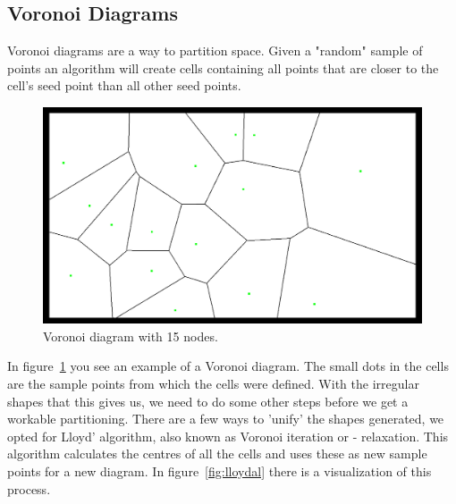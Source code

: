 \documentclass[11pt,a4paper,twocolumn]{article}
\begin{document}
\subsection{Voronoi Diagrams}
Voronoi diagrams are a way to partition space. Given a "random" sample of points an algorithm will create cells containing all points that are closer to the cell's seed point than all other seed points. 
\begin{figure}[h!]
	\centering
		\includegraphics[scale=.2]{images/voronoi-unrelaxed}
		\caption{Voronoi diagram with 15 nodes.}
	\label{fig:pccs:voronoi}
\end{figure}
In figure~\ref{fig:pccs:voronoi} you see an example of a Voronoi diagram. The small dots in the cells are the sample points from which the cells were defined. With the irregular shapes that this gives us, we need to do some other steps before we get a workable partitioning. There are a few ways to 'unify' the shapes generated, we opted for Lloyd' algorithm, also known as Voronoi iteration or - relaxation. This algorithm calculates the centres of all the cells and uses these as new sample points for a new diagram. In figure~\ref{fig:lloydal} there is a visualization of this process.
\end{document}
